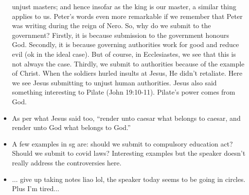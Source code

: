 \begin{itemize}
{  unjust masters; and hence insofar as the king is our master, a similar
  thing applies to us.  Peter's words even more remarkable if we remember
  that Peter was writing during the reign of Nero.  So, why do we submit to
  the government?  Firstly, it is because submission to the government
  honours God.  Secondly, it is because governing authorities work for good
  and reduce evil (ok in the ideal case).  But of course, in Ecclesiastes, we
  see that this is not always the case.  Thirdly, we submit to authorities
  because of the example of Christ.  When the soldiers hurled insults at
  Jesus, He didn't retaliate.  Here we see Jesus submitting to unjust human
  authorities.  Jesus also said something interesting to Pilate (John
  19:10-11).  Pilate's power comes from God.}
  \item{As per what Jesus said too, ``render unto caesar what belongs to
  caesar, and render unto God what belongs to God.''}
  \item{A few examples in sg are: should we submit to compulsory education
  act?  Should we submit to covid laws?  Interesting examples but the speaker
  doesn't really address the controversies here.}
  \item{$\dots$ give up taking notes liao lol, the speaker today seems to be
  going in circles.  Plus I'm tired...}
\end{itemize}